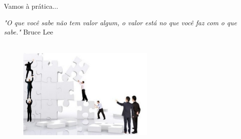 \begin{frame}{Vamos à prática...}

	\textit{"O que você sabe não tem valor algum, o valor está no que você faz com o que sabe."} Bruce Lee
	\\~\\
	\begin{figure}[hb]
		\includegraphics[width=0.6\textwidth]{figures/pratica.jpg}
	\end{figure}
\end{frame}

